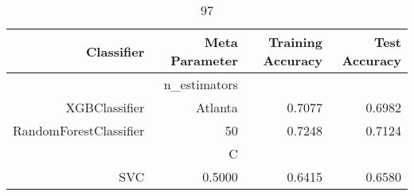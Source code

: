 
\begin{table}[H]
    \caption{97}
    \centering
    \begin{tabular}{|r|r|r|r|}
        \hline
        Classifier &Meta Parameter &Training Accuracy
        &Test Accuracy\\
        \hline
        &n\_estimators &\multicolumn{2}{|r|}{}\\
        \hline
        XGBClassifier &Atlanta &0.7077 &0.6982\\
        \hline
        RandomForestClassifier &50 &0.7248 &0.7124\\
        \hline
        &C &\multicolumn{2}{|r|}{}\\
        \hline
        SVC &0.5000 &0.6415 &0.6580\\
        \hline
    \end{tabular}
\end{table}
